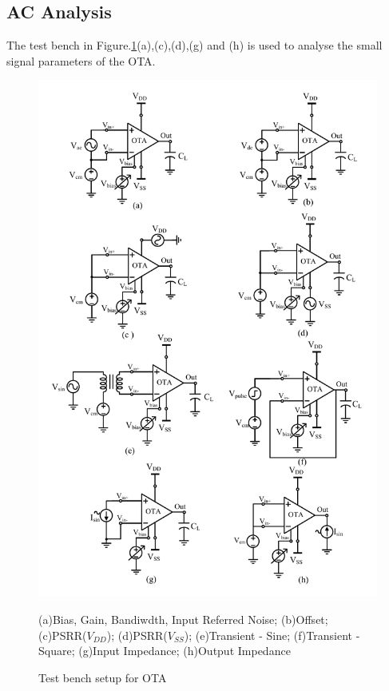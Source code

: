 \subsection{AC Analysis}
The test bench in Figure.\ref{fig:OTA_TB}(a),(c),(d),(g) and (h) is used to analyse the small signal parameters of the OTA.

\begin{figure} [H]
\centering
\includegraphics[scale=0.78]{Figures/Test_Benches/OTA_TB.pdf}
\caption{Test bench setup for OTA}
\label{fig:OTA_TB}
(a)Bias, Gain, Bandiwdth, Input Referred Noise; (b)Offset; (c)PSRR($V_{DD}$); (d)PSRR($V_{SS}$); (e)Transient - Sine; (f)Transient - Square; (g)Input Impedance; (h)Output Impedance
\end{figure}

